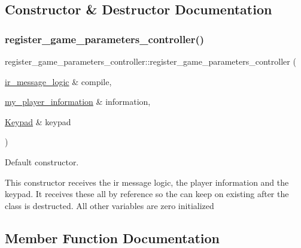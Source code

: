 \subsection{Constructor \& Destructor Documentation}
\hypertarget{classregister__game__parameters__controller_a291e306ca9e214208d0145058af13eeb}{}\label{classregister__game__parameters__controller_a291e306ca9e214208d0145058af13eeb} 
\subsubsection{\texorpdfstring{register\+\_\+game\+\_\+parameters\+\_\+controller()}{register\_game\_parameters\_controller()}}
{\footnotesize\ttfamily register\+\_\+game\+\_\+parameters\+\_\+controller\+::register\+\_\+game\+\_\+parameters\+\_\+controller (\begin{DoxyParamCaption}\item[{\hyperlink{classir__message__logic}{ir\+\_\+message\+\_\+logic} \&}]{compile,  }\item[{\hyperlink{classmy__player__information}{my\+\_\+player\+\_\+information} \&}]{information,  }\item[{\hyperlink{class_keypad}{Keypad} \&}]{keypad }\end{DoxyParamCaption})\hspace{0.3cm}{\ttfamily [inline]}}



Default constructor. 

This constructor receives the ir message logic, the player information and the keypad. It receives these all by reference so the can keep on existing after the class is destructed. All other variables are zero initialized 

\subsection{Member Function Documentation}
\hypertarget{classregister__game__parameters__controller_a9599db32b65bd0839ae4037acfdadd95}{}\label{classregister__game__parameters__controller_a9599db32b65bd0839ae4037acfdadd95} 
